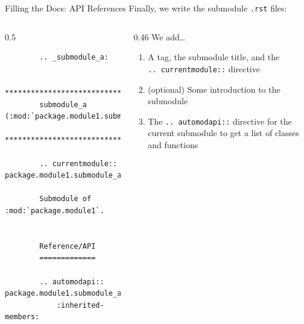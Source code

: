 \begin{darkframe}[fragile]{Filling the Docs: API References}
  Finally, we write the submodule \texttt{.rst} files:

  \begin{columns}[onlytextwidth]
    \begin{column}{0.5\textwidth}
      \footnotesize
      \begin{verbatim}
        .. _submodule_a:

        ************************************************
        submodule_a (:mod:`package.module1.submodule_a`)
        ************************************************

        .. currentmodule:: package.module1.submodule_a

        Submodule of :mod:`package.module1`.


        Reference/API
        =============

        .. automodapi:: package.module1.submodule_a
            :inherited-members:
      \end{verbatim}
    \end{column}
    \hfill
    \begin{column}{0.46\textwidth}
      We add\dots
      \begin{enumerate}
        \setlength{\itemsep}{1.5em}
        \item A tag, the submodule title, and the\\\texttt{.. currentmodule::} directive
        \item (optional) Some introduction to the submodule
        \item The \texttt{.. automodapi::} directive for the current submodule to get a list of
          classes and functions
      \end{enumerate}
    \end{column}
  \end{columns}
\end{darkframe}

